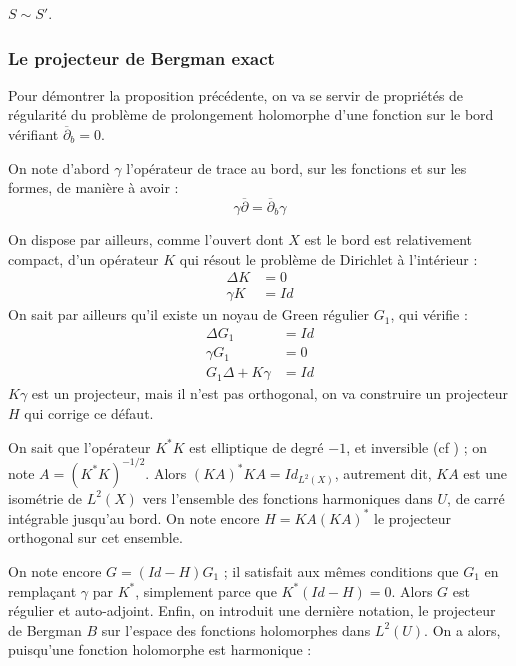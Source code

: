 \begin{prop}
  $S \sim S'$.
\end{prop}

\subsubsection{Le projecteur de Bergman exact}
Pour démontrer la proposition précédente, on va se servir de propriétés de régularité du problème de prolongement holomorphe d'une fonction sur le bord vérifiant $\overline{\partial}_b =0$.

On note d'abord $\gamma$ l'opérateur de trace au bord, sur les fonctions et sur les formes, de manière à avoir :
\begin{equation*}
  \gamma \overline{\partial} = \overline{\partial}_b\gamma
\end{equation*}

\noindent On dispose par ailleurs, comme l'ouvert dont $X$ est le bord est relativement compact, d'un opérateur $K$ qui résout le problème de Dirichlet à l'intérieur :
\begin{align*}
  \Delta K &= 0\\
  \gamma K &= Id
\end{align*}
On sait par ailleurs qu'il existe un noyau de Green régulier $G_1$, qui vérifie :
\begin{align*}
  \Delta G_1 &= Id\\
  \gamma G_1 &= 0\\
  G_1\Delta  + K\gamma &= Id
\end{align*}
$K\gamma$ est un projecteur, mais il n'est pas orthogonal, on va construire un projecteur $H$ qui corrige ce défaut.

On sait que l'opérateur $K^*K$ est elliptique de degré $-1$, et inversible (cf \cite{krantz1992partial}) ; on note $A=(K^*K)^{-1/2}$. Alors $(KA)^*KA = Id_{L^2(X)}$, autrement dit, $KA$ est une isométrie de $L^2(X)$ vers l'ensemble des fonctions harmoniques dans $U$, de carré intégrable jusqu'au bord. On note encore $H=KA(KA)^*$ le projecteur orthogonal sur cet ensemble.

On note encore $G=(Id-H)G_1$ ; il satisfait aux mêmes conditions que $G_1$ en remplaçant $\gamma$ par $K^*$, simplement parce que $K^*(Id-H) = 0$. Alors $G$ est régulier et auto-adjoint. Enfin, on introduit une dernière notation, le projecteur de Bergman $B$ sur l'espace des fonctions holomorphes dans $L^2(U)$. On a alors, puisqu'une fonction holomorphe est harmonique :


